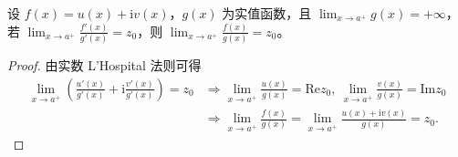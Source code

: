 \documentclass[../../main.tex]{subfiles}
\begin{document}
\begin{proposition}\label{proposition:L'Hospital法则(复变函数版本)}
设 \( f(x) = u(x) + \mathrm{i} v(x) \)，\( g(x) \) 为实值函数，且 \( \lim_{x \to a^+} g(x) = +\infty \)，若 \( \lim_{x \to a^+} \frac{f'(x)}{g'(x)} = z_0 \)，则 \( \lim_{x \to a^+} \frac{f(x)}{g(x)} = z_0 \)。
\end{proposition}
\begin{proof}
由实数 L’Hospital 法则可得
\begin{align*}
\lim_{x \to a^+} \left( \frac{u'(x)}{g'(x)} + \mathrm{i} \frac{v'(x)}{g'(x)} \right) = z_0 &\Rightarrow \lim_{x \to a^+} \frac{u(x)}{g(x)} = \mathrm{Re} z_0,\ \lim_{x \to a^+} \frac{v(x)}{g(x)} = \mathrm{Im} z_0 \\
&\Rightarrow \lim_{x \to a^+} \frac{f(x)}{g(x)} = \lim_{x \to a^+} \frac{u(x) + \mathrm{i} v(x)}{g(x)} = z_0.
\end{align*} 
\end{proof}
\end{document}
